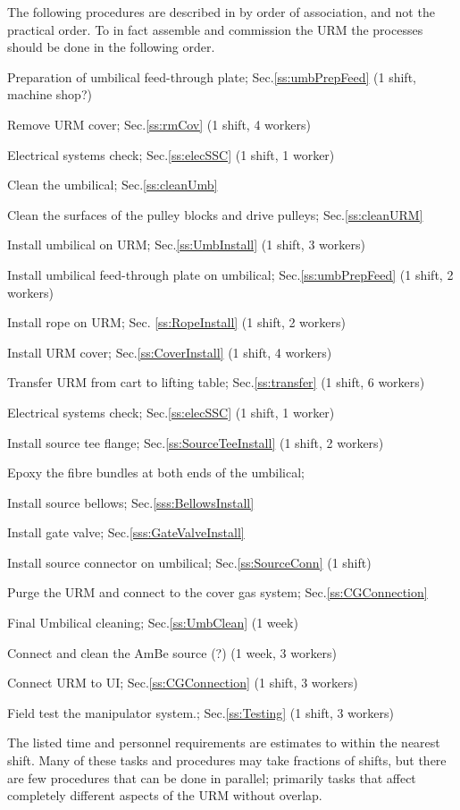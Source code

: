 \documentclass[11pt]{article}
\begin{document}
The following procedures are described in by order of association, and not the practical order. To in fact assemble and commission the URM the processes should be done in the following order. 
\begin{answerlist}
\item Preparation of umbilical feed-through plate; Sec.\ref{ss:umbPrepFeed} (1 shift, machine shop?)
\item Remove URM cover; Sec.\ref{ss:rmCov} (1 shift, 4 workers)
\item Electrical systems check; Sec.\ref{ss:elecSSC} (1 shift, 1 worker)
\item Clean the umbilical; Sec.\ref{ss:cleanUmb}
\item Clean the surfaces of the pulley blocks and drive pulleys; Sec.\ref{ss:cleanURM}
\item Install umbilical on URM; Sec.\ref{ss:UmbInstall} (1 shift, 3 workers)
\item Install umbilical feed-through plate on umbilical; Sec.\ref{ss:umbPrepFeed} (1 shift, 2 workers)
\item Install rope on URM; Sec. \ref{ss:RopeInstall} (1 shift, 2 workers)
\item Install URM cover; Sec.\ref{ss:CoverInstall} (1 shift, 4 workers)
\item Transfer URM from cart to lifting table; Sec.\ref{ss:transfer} (1 shift, 6 workers)
\item Electrical systems check; Sec.\ref{ss:elecSSC} (1 shift, 1 worker)
\item Install source tee flange; Sec.\ref{ss:SourceTeeInstall} (1 shift, 2 workers)
\item Epoxy the fibre bundles at both ends of the umbilical;
\item Install source bellows; Sec.\ref{sss:BellowsInstall}
\item Install gate valve; Sec.\ref{sss:GateValveInstall}
\item Install source connector on umbilical; Sec.\ref{ss:SourceConn} (1 shift)
\item Purge the URM and connect to the cover gas system; Sec.\ref{ss:CGConnection}
\item Final Umbilical cleaning; Sec.\ref{ss:UmbClean} (1 week)
\item Connect and clean the AmBe source (?) (1 week, 3 workers)
\item Connect URM to UI; Sec.\ref{ss:CGConnection} (1 shift, 3 workers)
\item Field test the manipulator system.; Sec.\ref{ss:Testing} (1 shift, 3 workers)
\end{answerlist}
The listed time and personnel requirements are estimates to within the nearest shift. Many of these tasks and procedures may take fractions of shifts, but there are few procedures that can be done in parallel; primarily tasks that affect completely different aspects of the URM without overlap.
\end{document}
